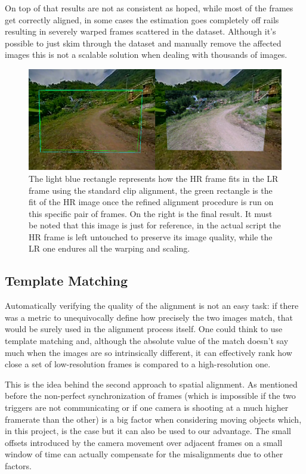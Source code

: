 On top of that results are not as consistent as hoped, while most of the frames get correctly aligned, in some cases the estimation goes completely off rails resulting in severely warped frames scattered in the dataset. Although it's possible to just skim through the dataset and manually remove the affected images this is not a scalable solution when dealing with thousands of images.

\begin{figure}[H]
  \centering
  \includegraphics[width=1\textwidth]{figures/deep_match_sbs.png}
  \caption{The light blue rectangle represents how the HR frame fits in the LR frame using the standard clip alignment, the green rectangle is the fit of the HR image once the refined alignment procedure is run on this specific pair of frames. On the right is the final result. It must be noted that this image is just for reference, in the actual script the HR frame is left untouched to preserve its image quality, while the LR one endures all the warping and scaling.}
  \label{img:deep_match}
\end{figure}

\subsection {Template Matching}
\label{subsec:template_match}

Automatically verifying the quality of the alignment is not an easy task: if there was a metric to unequivocally define how precisely the two images match, that would be surely used in the alignment process itself. One could think to use template matching and, although the absolute value of the match doesn't say much when the images are so intrinsically different, it can effectively rank how close a set of low-resolution frames is compared to a high-resolution one.

This is the idea behind the second approach to spatial alignment. As mentioned before the non-perfect synchronization of frames (which is impossible if the two triggers are not communicating or if one camera is shooting at a much higher framerate than the other) is a big factor when considering moving objects which, in this project, is the case but it can also be used to our advantage. The small offsets introduced by the camera movement over adjacent frames on a small window of time can actually compensate for the misalignments due to other factors.

